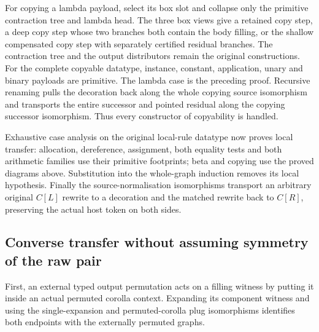 
For copying a lambda payload, select its box slot and collapse only the
primitive contraction tree and lambda head. The three box views give a
retained copy step, a deep copy step whose two branches both contain the
body filling, or the shallow compensated copy step with separately certified
residual branches. The contraction tree and the output distributors remain
the original constructions. For the complete copyable datatype, instance,
constant, application, unary and binary payloads are primitive. The lambda
case is the preceding proof. Recursive renaming pulls the decoration back
along the whole copying source isomorphism and transports the entire
successor and pointed residual along the copying successor isomorphism.
Thus every constructor of copyability is handled.


Exhaustive case analysis on the original local-rule datatype now proves local
transfer: allocation, dereference, assignment, both equality tests and both
arithmetic families use their primitive footprints; beta and copying use
the proved diagrams above. Substitution into the whole-graph induction removes
its local hypothesis. Finally the source-normalisation isomorphisms transport
an arbitrary original $C[L]$ rewrite to a decoration and the matched rewrite
back to $C[R]$, preserving the actual host token on both sides.


\subsection{Converse transfer without assuming symmetry of the raw pair}
First, an external typed output permutation acts on a filling witness by
putting it inside an actual permuted corolla context. Expanding its component
witness and using the single-expansion and permuted-corolla plug isomorphisms
identifies both endpoints with the externally permuted graphs.

